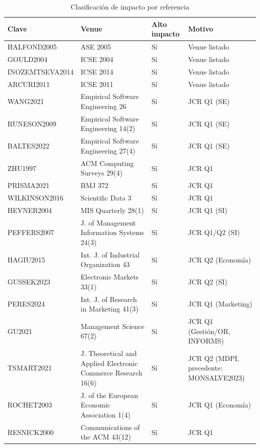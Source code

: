 \begin{table}[H]
\centering
\caption{Clasificación de impacto por referencia}
\label{tab:clasificacion-biblio}
\small
\begin{tabular}{@{}p{2.6cm}p{6.4cm}p{1.8cm}p{2.8cm}@{}}
\toprule
\textbf{Clave} & \textbf{Venue} & \textbf{Alto impacto} & \textbf{Motivo} \\
\midrule
HALFOND2005    & ASE 2005                          & Sí & Venue listado \\
GOULD2004      & ICSE 2004                         & Sí & Venue listado \\
INOZEMTSEVA2014 & ICSE 2014                        & Sí & Venue listado \\
ARCURI2011     & ICSE 2011                         & Sí & Venue listado \\
WANG2021       & Empirical Software Engineering 26 & Sí & JCR Q1 (SE) \\
RUNESON2009    & Empirical Software Engineering 14(2) & Sí & JCR Q1 (SE) \\
BALTES2022     & Empirical Software Engineering 27(4) & Sí & JCR Q1 (SE) \\
ZHU1997        & ACM Computing Surveys 29(4)       & Sí & JCR Q1 \\
PRISMA2021     & BMJ 372                           & Sí & JCR Q1 \\
WILKINSON2016  & Scientific Data 3                 & Sí & JCR Q1 \\
HEVNER2004     & MIS Quarterly 28(1)                & Sí & JCR Q1 (SI) \\
PEFFERS2007    & J. of Management Information Systems 24(3) & Sí & JCR Q1/Q2 (SI) \\
HAGIU2015      & Int. J. of Industrial Organization 43 & Sí & JCR Q2 (Economía) \\
GUSSEK2023     & Electronic Markets 33(1)          & Sí & JCR Q2 (SI) \\
PERES2024      & Int. J. of Research in Marketing 41(3) & Sí & JCR Q1 (Marketing) \\
GU2021         & Management Science 67(2)          & Sí & JCR Q1 (Gestión/OR, INFORMS) \\
TSMART2021     & J. Theoretical and Applied Electronic Commerce Research 16(6) & Sí & JCR Q2 (MDPI, precedente: MONSALVE2023) \\
ROCHET2003     & J. of the European Economic Association 1(4) & Sí & JCR Q1 (Economía) \\
RESNICK2000    & Communications of the ACM 43(12)  & Sí & JCR Q1 \\

\end{tabular}
\end{table}
